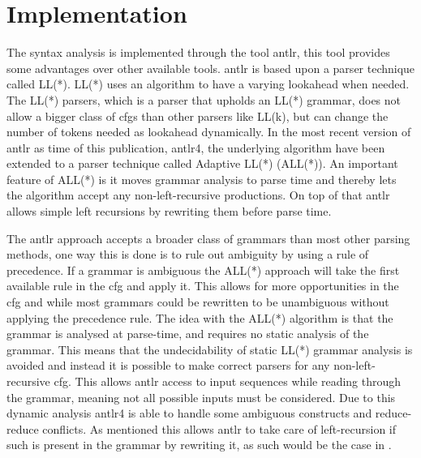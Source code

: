 \section{Implementation}\label{sec:ANTLR}
The syntax analysis is implemented through the tool \acrfull{antlr}, this tool provides some advantages over other available tools.
\acrshort{antlr} is based upon a parser technique called LL(*).
LL(*) uses an algorithm to have a varying lookahead when needed.
The LL(*) parsers, which is a parser that upholds an LL(*) grammar, does not allow a bigger class of \acrshort{cfg}s than other parsers like LL(k), but can change the number of tokens needed as lookahead dynamically. 
In the most recent version of \acrshort{antlr} as time of this publication, \acrshort{antlr}4, the underlying algorithm have been extended to a parser technique called Adaptive LL(*) (ALL(*)).
An important feature of ALL(*) is it moves grammar analysis to parse time and thereby lets the algorithm accept any non-left-recursive productions.
On top of that \acrshort{antlr} allows simple left recursions by rewriting them before parse time.

The \acrshort{antlr} approach accepts a broader class of grammars than most other parsing methods, one way this is done is to rule out ambiguity by using a rule of precedence.
If a grammar is ambiguous the ALL(*) approach will take the first available rule in the \acrshort{cfg} and apply it.
This allows for more opportunities in the \acrshort{cfg} and while most grammars could be rewritten to be unambiguous without applying the precedence rule.
The idea with the ALL(*) algorithm is that the grammar is analysed at parse-time, and requires no static analysis of the grammar. 
This means that the undecidability of static LL(*) grammar analysis is avoided and instead it is possible to make correct parsers for any non-left-recursive \acrshort{cfg}.
This allows \acrshort{antlr} access to input sequences while reading through the grammar, meaning not all possible inputs must be considered.
Due to this dynamic analysis \acrshort{antlr}4 is able to handle some ambiguous constructs and reduce-reduce conflicts.
As mentioned this allows \acrshort{antlr} to take care of left-recursion if such is present in the grammar by rewriting it, as such would be the case in .

